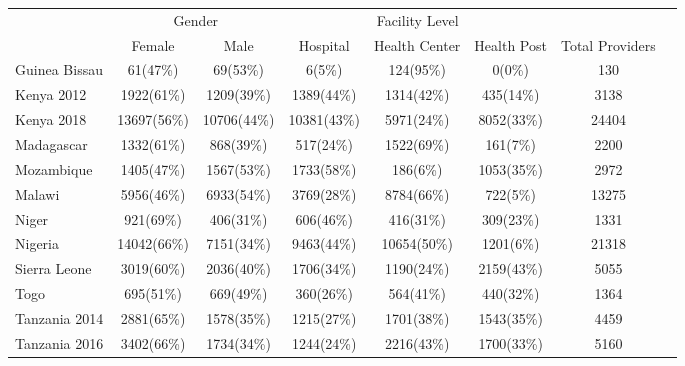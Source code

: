 \def\sym#1{\ifmmode^{#1}\else\(^{#1}\)\fi}
\begin{tabular}{l*{7}{c}}
\hline\hline
&\multicolumn{2}{c}{Gender} &\multicolumn{3}{c}{Facility Level}    \\\cmidrule(lr){2-3}\cmidrule(lr){4-6}
&\multicolumn{1}{c}{Female}&\multicolumn{1}{c}{Male}&\multicolumn{1}{c}{Hospital}&\multicolumn{1}{c}{Health Center}&\multicolumn{1}{c}{Health Post}&\multicolumn{1}{c}{Total Providers}&\\
\hline
Guinea Bissau&         {61(47\%)}&        {69(53\%)}&    {6(5\%)}&               {124(95\%)}&             {0(0\%)}&             {130}\\
Kenya 2012&            {1922(61\%)}&        {1209(39\%)}&    {1389(44\%)}&               {1314(42\%)}&             {435(14\%)}&             {3138}\\
Kenya 2018&        {13697(56\%)}&    {10706(44\%)}&    {10381(43\%)}&               {5971(24\%)}&             {8052(33\%)}&             {24404}\\
Madagascar&        {1332(61\%)}&    {868(39\%)}&    {517(24\%)}&               {1522(69\%)}&             {161(7\%)}&             {2200}\\
Mozambique&        {1405(47\%)}&    {1567(53\%)}&    {1733(58\%)}&               {186(6\%)}&             {1053(35\%)}&             {2972}\\
Malawi&                {5956(46\%)}&        {6933(54\%)}&    {3769(28\%)}&               {8784(66\%)}&             {722(5\%)}&             {13275}\\
Niger&                 {921(69\%)}&        {406(31\%)}&    {606(46\%)}&               {416(31\%)}&             {309(23\%)}&             {1331}\\
Nigeria&               {14042(66\%)}&        {7151(34\%)}&    {9463(44\%)}&               {10654(50\%)}&             {1201(6\%)}&             {21318}\\
Sierra Leone&      {3019(60\%)}&    {2036(40\%)}&    {1706(34\%)}&               {1190(24\%)}&             {2159(43\%)}&             {5055}\\
Togo&                  {695(51\%)}&  {669(49\%)}&        {360(26\%)}&             {564(41\%)}&             {440(32\%)}&             {1364}\\
Tanzania 2014&     {2881(65\%)}&  {1578(35\%)}&    {1215(27\%)}&             {1701(38\%)}&             {1543(35\%)}&             {4459}\\
Tanzania 2016&     {3402(66\%)}&  {1734(34\%)}&    {1244(24\%)}&             {2216(43\%)}&             {1700(33\%)}&             {5160}\\

\end{tabular}
